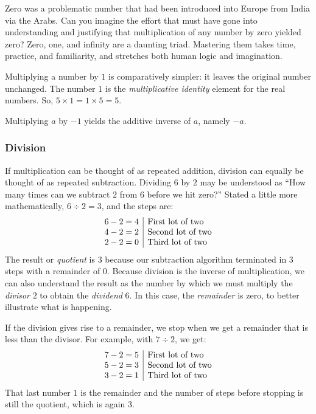 \documentclass[
  a4paper,
]{article}
\begin{document}
Zero was a problematic number that had been introduced into Europe from
India via the Arabs. Can you imagine the effort that must have gone into
understanding and justifying that multiplication of any number by zero
yielded zero? Zero, one, and infinity are a daunting triad. Mastering
them takes time, practice, and familiarity, and stretches both human
logic and imagination.

Multiplying a number by \(1\) is comparatively simpler: it leaves the
original number unchanged. The number \(1\) is the \emph{multiplicative
identity} element for the real numbers. So,
\(5 \times 1 = 1 \times 5 = 5\).

Multiplying \(a\) by \(-1\) yields the additive inverse of \(a\), namely
\(-a\).

\hypertarget{division}{%
\subsubsection{Division}\label{division}}

If multiplication can be thought of as repeated addition, division can
equally be thought of as repeated subtraction. Dividing \(6\) by \(2\)
may be understood as ``How many times can we subtract \(2\) from \(6\)
before we hit zero?'' Stated a little more mathematically,
\(6 \div 2 = 3\), and the steps are: \[
\begin{array}{r | l}
6 - 2 = 4 & \mbox{First lot of two}\\
4 - 2 = 2 & \mbox{Second lot of two}\\
2 - 2 = 0 & \mbox{Third lot of two}\\
\end{array}
\] The result or \emph{quotient} is \(3\) because our subtraction
algorithm terminated in \(3\) steps with a remainder of \(0\). Because
division is the inverse of multiplication, we can also understand the
result as the number by which we must multiply the \emph{divisor} \(2\)
to obtain the \emph{dividend} \(6\). In this case, the \emph{remainder}
is zero, to better illustrate what is happening.

If the division gives rise to a remainder, we stop when we get a
remainder that is less than the divisor. For example, with \(7 \div 2\),
we get: \[
\begin{array}{r | l}
7 - 2 = 5 & \mbox{First lot of two}\\
5 - 2 = 3 & \mbox{Second lot of two}\\
3 - 2 = 1 & \mbox{Third lot of two}\\
\end{array}
\] That last number \(1\) is the remainder and the number of steps
before stopping is still the quotient, which is again \(3\).
\end{document}
